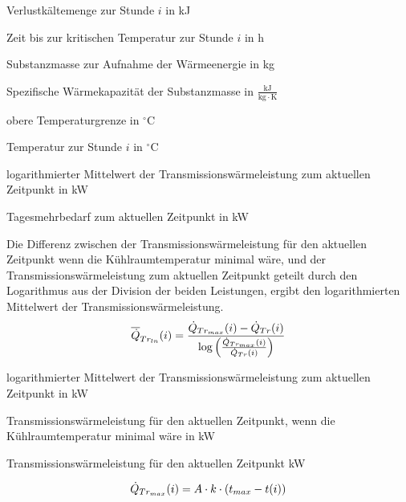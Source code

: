 \begin{description}[\dth]
	\item[$Q_{v_{ln}}(i)$] Verlustk\"altemenge zur Stunde $i$ in kJ
	\item[$\tau_{krit}(i)$] Zeit bis zur kritischen Temperatur zur Stunde
	$i$ in h
	\item[$m$] Substanzmasse zur Aufnahme der Wärmeenergie in kg
	\item[$c$] Spezifische Wärmekapazität der Substanzmasse in $\mathrm{\frac{kJ}{kg
		\cdot K}}$
	\item[$t_{max}$] obere Temperaturgrenze in $ ^{\circ} $C
	\item[$t(i)$] Temperatur zur Stunde $i$ in $ ^{\circ} $C
	\item[$\aptranslog(i)$] logarithmierter Mittelwert der
		Transmissionswärmeleistung zum aktuellen Zeitpunkt in kW
	\item[$\pmehr(i)$] Tagesmehrbedarf zum aktuellen Zeitpunkt in kW
\end{description}
\vspace{0.5cm}
Die Differenz zwischen der Transmissionswärmeleistung f\"ur den aktuellen
Zeitpunkt wenn die K\"uhlraumtemperatur minimal w\"are, und der
Transmissionswärmeleistung zum aktuellen Zeitpunkt geteilt durch den Logarithmus
aus der Division der beiden Leistungen, ergibt den logarithmierten Mittelwert
der Transmissionswärmeleistung.
\begin{equation}
	\aptranslog(i) = \frac{ \ptransm(i) - \ptrans(i) }{\log \left(
		\frac{\ptransm(i)}{\ptrans(i)} \right)}
	\label{log}
\end{equation}

\begin{description}[\dth]
	\item[$\aptranslog(i)$] logarithmierter Mittelwert der
		Transmissionswärmeleistung zum aktuellen Zeitpunkt in kW
	\item[$\ptransm(i)$] Transmissionswärmeleistung f\"ur den aktuellen
	Zeitpunkt, wenn die K\"uhlraumtemperatur minimal w\"are in kW
	\item[$\ptrans(i)$] Transmissionswärmeleistung f\"ur den aktuellen
	Zeitpunkt  kW
\end{description}
\vspace{0.5cm}

\begin{equation}
	\ptransm(i) = A \cdot k \cdot \left( t_{max} -
	t(i) \right)
	\label{ptransmi}
\end{equation}

